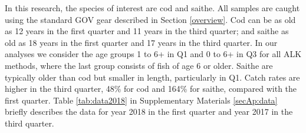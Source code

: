 \documentclass[a4paper 12pt]{article}
\numberwithin{equation}{section}
\begin{document}
In this research, the species of interest are cod and saithe. All samples are caught using the standard GOV gear described in Section \ref{overview}.  Cod can be as old as 12 years in the first quarter and 11 years in the third quarter; and saithe as old as 18 years in the first quarter and 17 years in the third quarter. In our analyses we consider the age groups 1 to 6+ in Q1 and 0 to 6+ in Q3 for all ALK methods, where the last group consists of fish of age 6 or older. Saithe are typically older than cod but smaller in length, particularly in Q1. Catch rates are higher in the third quarter, 48\% for cod and 164\% for saithe, compared with the first quarter. Table \ref{tab:data2018} in Supplementary Materials \ref{secAp:data} briefly describes the data for year 2018 in the first quarter and year 2017 in the third quarter.
\end{document}
